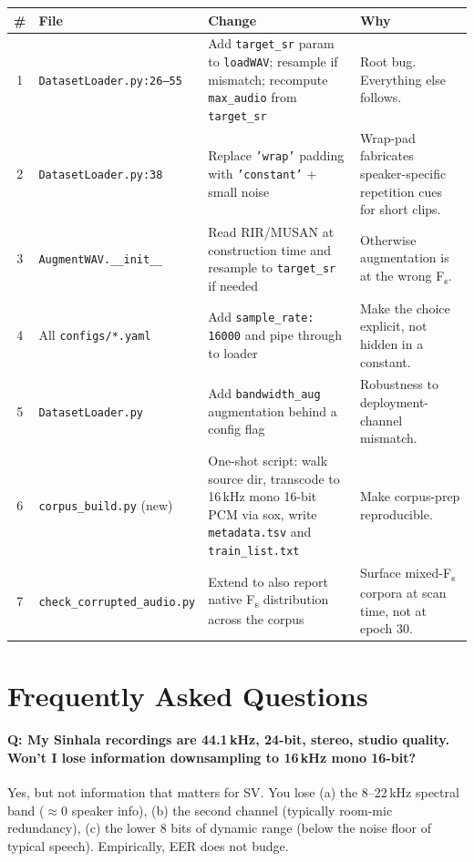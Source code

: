\documentclass[11pt,a4paper]{article}
\begin{document}
\begin{center}
\begin{tabular}{clp{5cm}p{4.5cm}}
\toprule
\# & File & Change & Why \\
\midrule
1 & \texttt{DatasetLoader.py:26--55} &
  Add \texttt{target\_sr} param to \texttt{loadWAV}; resample if mismatch; recompute
  \texttt{max\_audio} from \texttt{target\_sr} &
  Root bug. Everything else follows. \\[4pt]
2 & \texttt{DatasetLoader.py:38} &
  Replace \texttt{'wrap'} padding with \texttt{'constant'} + small noise &
  Wrap-pad fabricates speaker-specific repetition cues for short clips. \\[4pt]
3 & \texttt{AugmentWAV.\_\_init\_\_} &
  Read RIR/MUSAN at construction time and resample to \texttt{target\_sr} if needed &
  Otherwise augmentation is at the wrong F\textsubscript{s}. \\[4pt]
4 & All \texttt{configs/*.yaml} &
  Add \texttt{sample\_rate: 16000} and pipe through to loader &
  Make the choice explicit, not hidden in a constant. \\[4pt]
5 & \texttt{DatasetLoader.py} &
  Add \texttt{bandwidth\_aug} augmentation behind a config flag &
  Robustness to deployment-channel mismatch. \\[4pt]
6 & \texttt{corpus\_build.py} (new) &
  One-shot script: walk source dir, transcode to 16\,kHz mono 16-bit PCM via sox,
  write \texttt{metadata.tsv} and \texttt{train\_list.txt} &
  Make corpus-prep reproducible. \\[4pt]
7 & \texttt{check\_corrupted\_audio.py} &
  Extend to also report native F\textsubscript{s} distribution across the corpus &
  Surface mixed-F\textsubscript{s} corpora at scan time, not at epoch 30. \\
\bottomrule
\end{tabular}
\end{center}

\section{Frequently Asked Questions}
\label{sec:faq}

\paragraph{Q: My Sinhala recordings are 44.1\,kHz, 24-bit, stereo, studio quality. Won't I lose
information downsampling to 16\,kHz mono 16-bit?}
Yes, but not information that matters for SV. You lose (a) the 8--22\,kHz spectral band ($\approx$0
speaker info), (b) the second channel (typically room-mic redundancy), (c) the lower 8 bits of
dynamic range (below the noise floor of typical speech). Empirically, EER does not budge.
\end{document}

